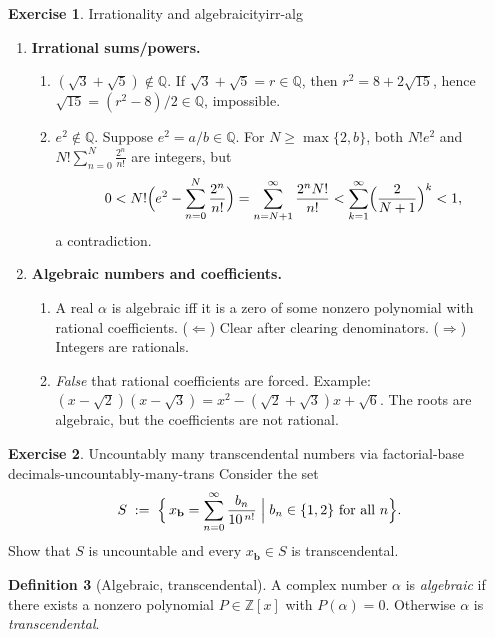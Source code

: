 \documentclass[11pt,a4paper]{article}
\theoremstyle{definition}
\newtheorem{exercise}{Exercise} %
\theoremstyle{definition}
\newtheorem{definition}[exercise]{Definition}
\theoremstyle{plain}
\theoremstyle{remark}
\begin{document}
\begin{exercise}{Irrationality and algebraicity}{irr-alg}
	\begin{enumerate}
		\item \textbf{Irrational sums/powers.}
		\begin{enumerate}
			\item $(\sqrt3+\sqrt5)\notin\mathbb Q$. If $\sqrt3+\sqrt5=r\in\mathbb Q$, then
			$r^2=8+2\sqrt{15}$, hence $\sqrt{15}=(r^2-8)/2\in\mathbb Q$, impossible.
			\item $e^2\notin\mathbb Q$. Suppose $e^2=a/b\in\mathbb Q$. For $N\ge\max\{2,b\}$,
			both $N!e^2$ and $N!\sum_{n=0}^{N}\frac{2^n}{n!}$ are integers, but
			\[
			0<N!\Bigl(e^2-\sum_{n=0}^{N}\frac{2^n}{n!}\Bigr)
			=\sum_{n=N+1}^{\infty}\frac{2^n N!}{n!}
			<\sum_{k=1}^{\infty}\Bigl(\frac{2}{N+1}\Bigr)^k<1,
			\]
			a contradiction.
		\end{enumerate}
		
		\item \textbf{Algebraic numbers and coefficients.}
		\begin{enumerate}
			\item A real $\alpha$ is algebraic iff it is a zero of some nonzero polynomial
			with rational coefficients. ($\Leftarrow$) Clear after clearing denominators.
			($\Rightarrow$) Integers are rationals.
			\item \emph{False} that rational coefficients are forced. Example:
			$(x-\sqrt2)(x-\sqrt3)=x^2-(\sqrt2+\sqrt3)x+\sqrt6$. The roots are algebraic,
			but the coefficients are not rational.
		\end{enumerate}
	\end{enumerate}
\end{exercise}


\begin{exercise}{Uncountably many transcendental numbers via factorial-base decimals}-{uncountably-many-trans}
	Consider the set
	\[
	S\;:=\;\Bigl\{\,x_{\mathbf b}=\sum_{n=0}^{\infty}\frac{b_n}{10^{\,n!}} \;\Big|\; b_n\in\{1,2\}\ \text{for all }n\Bigr\}.
	\]
	Show that $S$ is uncountable and every $x_{\mathbf b}\in S$ is transcendental.
\end{exercise}

\begin{definition}[Algebraic, transcendental]
	A complex number $\alpha$ is \emph{algebraic} if there exists a nonzero polynomial
	$P\in\mathbb Z[x]$ with $P(\alpha)=0$. Otherwise $\alpha$ is \emph{transcendental}.
\end{definition}
\end{document}
